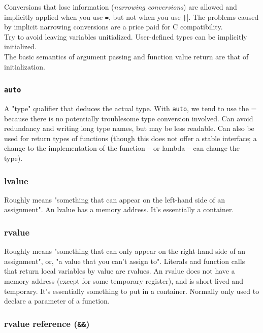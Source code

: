 \documentclass[table, xcdraw]{article}%
\begin{document}
Conversions that lose information (\textit{narrowing conversions}) are allowed and implicitly applied when you use \texttt{=}, but not when you use \texttt|{}|. The problems caused by implicit narrowing conversions are a price paid for C compatibility.\\
Try to avoid leaving variables unitialized. User-defined types can be implicitly initialized.\\
The basic semantics of argument passing and function value return are that of initialization.

\subsubsection{\texttt{auto}}

A "type" qualifier that deduces the actual type. With \texttt{auto}, we tend to use the = because there is no potentially troublesome type conversion involved. Can avoid redundancy and writing long type names, but may be less readable. Can also be used for return types of functions (though this does not offer a stable interface; a change to the implementation of the function -- or lambda -- can change the type).

\subsubsection{lvalue} \label{lvalue}

Roughly means "something that can appear on the left-hand side of an assignment". An lvalue has a memory address. It's essentially a container.

\subsubsection{rvalue}

Roughly means "something that can only appear on the right-hand side of an assignment", or, "a value that you can't assign to". Literals and function calls that return local variables by value are rvalues. An rvalue does not have a memory address (except for some temporary register), and is short-lived and temporary. It's essentially something to put in a container. Normally only used to declare a parameter of a function.

\subsubsection{rvalue reference (\texttt{&&})} \label{rvaluereference}
\end{document}
